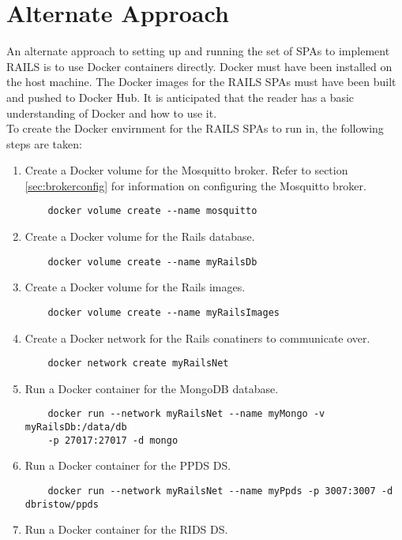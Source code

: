 \chapter{Alternate Approach} 
\label{ch:altsapproach}
An alternate approach to setting up and running the set of \acp{SPA} to implement \ac{RAILS} is to use Docker containers directly. Docker must have been installed on the host machine. The Docker images for the \ac{RAILS} \acp{SPA} must have been built and pushed to Docker Hub. It is anticipated that the reader has a basic understanding of Docker and how to use it.\\
To create the Docker envirnment for the \ac{RAILS} \acp{SPA} to run in, the following steps are taken:
\begin{enumerate}
    \item Create a Docker volume for the Mosquitto broker. Refer to section \ref{sec:brokerconfig} for information on configuring the Mosquitto broker.
    \begin{verbatim}
    docker volume create --name mosquitto
    \end{verbatim}
    \item Create a Docker volume for the Rails database.
    \begin{verbatim}
    docker volume create --name myRailsDb  
    \end{verbatim}
    \item Create a Docker volume for the Rails images.
    \begin{verbatim}
    docker volume create --name myRailsImages
    \end{verbatim}
    \item Create a Docker network for the Rails conatiners to communicate over.
    \begin{verbatim}
    docker network create myRailsNet
    \end{verbatim}
    \item Run a Docker container for the MongoDB database.
    \begin{verbatim}
    docker run --network myRailsNet --name myMongo -v myRailsDb:/data/db
    -p 27017:27017 -d mongo
    \end{verbatim}
    \item Run a Docker container for the \ac{PPDS} \ac{DS}.
    \begin{verbatim}
    docker run --network myRailsNet --name myPpds -p 3007:3007 -d dbristow/ppds
    \end{verbatim}
    \item Run a Docker container for the \ac{RIDS} \ac{DS}.

\end{enumerate}
